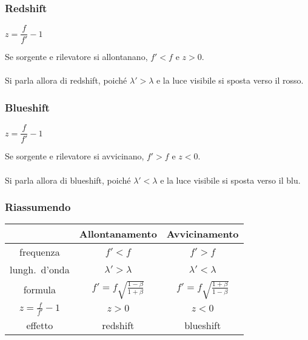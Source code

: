 \documentclass[]{beamer}
\theoremstyle{plain}
\begin{document}
\begin{frame}
\frametitle{Redshift}
\begin{center}
$ z = \dfrac{f}{f'} - 1 $
\end{center}
Se sorgente e rilevatore si allontanano, $ f' < f $ e \alert{$ z > 0 $}.\\~\pause\\
Si parla allora di \alert{redshift}, poiché $ \lambda' > \lambda $ e la luce visibile si sposta verso il rosso.

\end{frame}



\begin{frame}
\frametitle{Blueshift}
\begin{center}
$ z = \dfrac{f}{f'} - 1 $
\end{center}
Se sorgente e rilevatore si avvicinano, $ f' > f $ e \alert{$ z < 0 $}.\\~\pause\\
Si parla allora di \alert{blueshift}, poiché $ \lambda' < \lambda $ e la luce visibile si sposta verso il blu.

\end{frame}


\begin{frame}
\frametitle{Riassumendo}

\centering
  \begin{tabular}{c|c|c}
    &\textbf{Allontanamento} & \textbf{Avvicinamento} \\\hline\rule{0pt}{3ex}
    frequenza & $ f' < f $ & $ f' > f $ \\\rule{0pt}{6ex}
    lungh.~d'onda & $ \lambda' > \lambda $ & $ \lambda' < \lambda $ \\\rule{0pt}{6ex}
    formula & $ f' = f \sqrt{\frac{1 - \beta}{1 + \beta}} $ & $ f' = f \sqrt{\frac{1 + \beta}{1 - \beta}} $ \\\rule{0pt}{6ex}
    $ z = \frac{f}{f'} - 1 $ & $ z >0 $ & $ z < 0 $ \\\rule{0pt}{6ex}
    effetto & redshift & blueshift \\
  \end{tabular}
\end{frame}
\end{document}
